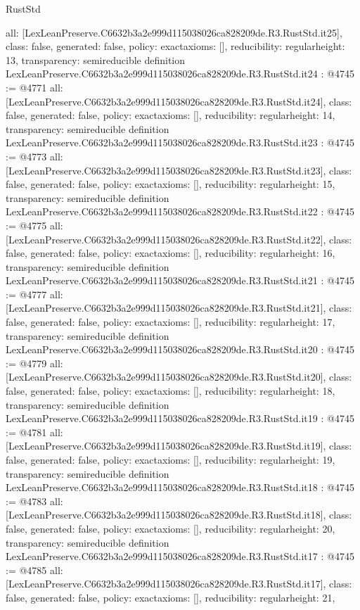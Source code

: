 \begin{lexlean}{RustStd}
\begin{coremodule}
{  all: [LexLeanPreserve.C6632b3a2e999d115038026ca828209de.R3.RustStd.it25],
  class: false,
  generated: false,
  policy: exact{axioms: []},
  reducibility: regular{height: 13},
  transparency: semireducible
}
definition LexLeanPreserve.C6632b3a2e999d115038026ca828209de.R3.RustStd.it24 : @4745 := @4771 {
  all: [LexLeanPreserve.C6632b3a2e999d115038026ca828209de.R3.RustStd.it24],
  class: false,
  generated: false,
  policy: exact{axioms: []},
  reducibility: regular{height: 14},
  transparency: semireducible
}
definition LexLeanPreserve.C6632b3a2e999d115038026ca828209de.R3.RustStd.it23 : @4745 := @4773 {
  all: [LexLeanPreserve.C6632b3a2e999d115038026ca828209de.R3.RustStd.it23],
  class: false,
  generated: false,
  policy: exact{axioms: []},
  reducibility: regular{height: 15},
  transparency: semireducible
}
definition LexLeanPreserve.C6632b3a2e999d115038026ca828209de.R3.RustStd.it22 : @4745 := @4775 {
  all: [LexLeanPreserve.C6632b3a2e999d115038026ca828209de.R3.RustStd.it22],
  class: false,
  generated: false,
  policy: exact{axioms: []},
  reducibility: regular{height: 16},
  transparency: semireducible
}
definition LexLeanPreserve.C6632b3a2e999d115038026ca828209de.R3.RustStd.it21 : @4745 := @4777 {
  all: [LexLeanPreserve.C6632b3a2e999d115038026ca828209de.R3.RustStd.it21],
  class: false,
  generated: false,
  policy: exact{axioms: []},
  reducibility: regular{height: 17},
  transparency: semireducible
}
definition LexLeanPreserve.C6632b3a2e999d115038026ca828209de.R3.RustStd.it20 : @4745 := @4779 {
  all: [LexLeanPreserve.C6632b3a2e999d115038026ca828209de.R3.RustStd.it20],
  class: false,
  generated: false,
  policy: exact{axioms: []},
  reducibility: regular{height: 18},
  transparency: semireducible
}
definition LexLeanPreserve.C6632b3a2e999d115038026ca828209de.R3.RustStd.it19 : @4745 := @4781 {
  all: [LexLeanPreserve.C6632b3a2e999d115038026ca828209de.R3.RustStd.it19],
  class: false,
  generated: false,
  policy: exact{axioms: []},
  reducibility: regular{height: 19},
  transparency: semireducible
}
definition LexLeanPreserve.C6632b3a2e999d115038026ca828209de.R3.RustStd.it18 : @4745 := @4783 {
  all: [LexLeanPreserve.C6632b3a2e999d115038026ca828209de.R3.RustStd.it18],
  class: false,
  generated: false,
  policy: exact{axioms: []},
  reducibility: regular{height: 20},
  transparency: semireducible
}
definition LexLeanPreserve.C6632b3a2e999d115038026ca828209de.R3.RustStd.it17 : @4745 := @4785 {
  all: [LexLeanPreserve.C6632b3a2e999d115038026ca828209de.R3.RustStd.it17],
  class: false,
  generated: false,
  policy: exact{axioms: []},
  reducibility: regular{height: 21},
}
\end{coremodule}
\end{lexlean}
